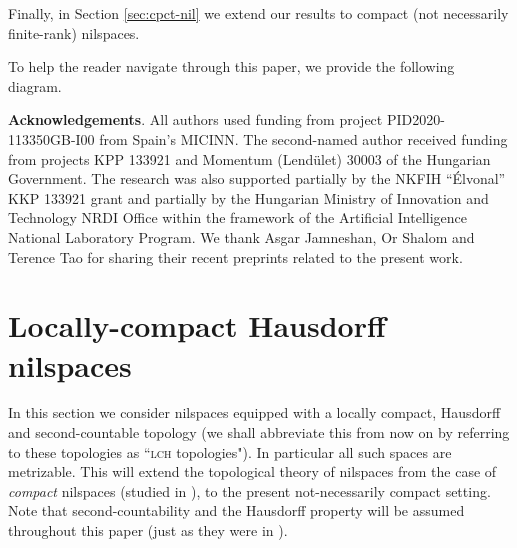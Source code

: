 \documentclass[a4paper,12pt,reqno]{amsart}
\theoremstyle{definition}
\begin{document}
Finally, in Section \ref{sec:cpct-nil} we extend our results to compact (not necessarily finite-rank) nilspaces.

To help the reader navigate through this paper, we provide the following diagram.



\newpage

\begin{figure}[omitted: a diagram of this paper's results, not reproduced here]\end{figure}



 

\noindent \textbf{Acknowledgements}. All authors used funding from project PID2020-113350GB-I00 from Spain’s MICINN.
The second-named author received funding from projects KPP 133921 and Momentum
(Lend\"ulet) 30003 of the Hungarian Government. The research was also supported partially
by the NKFIH ``\'Elvonal” KKP 133921 grant and partially by the Hungarian Ministry of
Innovation and Technology NRDI Office within the framework of the Artificial Intelligence
National Laboratory Program. We thank Asgar Jamneshan, Or Shalom and Terence Tao for sharing their recent preprints \cite{JST1,JST2}  related to the present work.





\section{Locally-compact Hausdorff nilspaces}\label{sec:lch}

In this section we consider nilspaces equipped with a  locally compact, Hausdorff and second-countable topology (we shall abbreviate this from now on by referring to these topologies as ``\textsc{lch} topologies"). In particular all such spaces are metrizable. This will extend the topological theory of nilspaces from the case of  \emph{compact} nilspaces (studied in \cite{CamSzeg,Cand:Notes2}), to the present not-necessarily compact setting. Note that second-countability and the Hausdorff property will be assumed throughout this paper (just as they were in \cite{CamSzeg,Cand:Notes2}).
\end{document}
